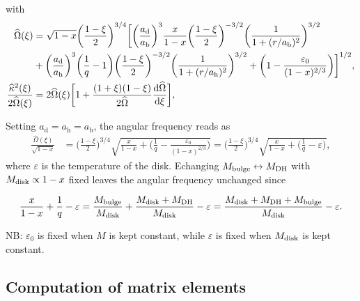 \documentclass[11pt]{article}
\newcommand{\rd}{\mathrm{d}}
\newcommand{\Mb}{M_{\rm{bulge}}}
\newcommand{\Md}{M_{\rm{disk}}}
\newcommand{\Mdh}{M_{\rm{DH}}}
\newcommand{\ad}{a_{\mathrm{d}}}
\newcommand{\ab}{a_{\mathrm{b}}}
\newcommand{\ah}{a_{\mathrm{h}}}
\newcommand{\hOmega}{\widehat{\Omega}}
\newcommand{\hkappa}{\widehat{\kappa}}
\begin{document}
with 
\begin{align}
\hOmega(\xi) &=\sqrt{1-x}\bigg(\frac{1-\xi}{2}\bigg)^{3/4}  \bigg[\bigg( \frac{\ad}{\ab}\bigg)^3\frac{x}{1-x} \bigg(\frac{1-\xi}{2}\bigg)^{-3/2} \bigg(\frac{1}{1+(r/\ab)^2}\bigg)^{3/2} \notag \\
&+\bigg( \frac{\ad}{\ah}\bigg)^3\bigg(\frac{1}{q}-1\bigg) \bigg(\frac{1-\xi}{2}\bigg)^{-3/2} \bigg(\frac{1}{1+(r/\ah)^2}\bigg)^{3/2} 
+   \bigg(1-  \frac{\varepsilon_0}{ (1-x)^{2/3}} \bigg) \bigg]^{1/2} , \\
\frac{\hkappa^2(\xi)}{2\hOmega(\xi)} & = 2\hOmega(\xi) \bigg[1+\frac{(1+\xi)(1-\xi)}{2\hOmega}\frac{\rd \hOmega }{\rd \xi} \bigg],
\end{align}




Setting $\ad=\ah=\ab$, the angular frequency reads as
\begin{align}
\frac{\hOmega(\xi)}{\sqrt{1-x}} &=\bigg(\frac{1-\xi}{2}\bigg)^{3/4}  \sqrt{\frac{x}{1-x} +   \bigg(\frac{1}{q}-  \frac{\varepsilon_0}{ (1-x)^{2/3}} \bigg) }=\bigg(\frac{1-\xi}{2}\bigg)^{3/4}  \sqrt{\frac{x}{1-x} +   \bigg(\frac{1}{q}-  \varepsilon \bigg) } ,
\end{align}
where $\varepsilon$ is the temperature of the disk. Echanging $\Mb \leftrightarrow \Mdh$ with $\Md \propto 1-x$ fixed leaves the angular frequency unchanged since

$$\frac{x}{1-x} +\frac{1}{q}-  \varepsilon = \frac{\Mb}{\Md} + \frac{\Md+\Mdh}{\Md} - \varepsilon= \frac{\Md+\Mdh+\Mb}{\Md} - \varepsilon. $$

NB: $\varepsilon_0$ is fixed when $M$ is kept constant, while $\varepsilon$ is fixed when $\Md$ is kept constant.

\subsection{Computation of matrix elements}
\end{document}
